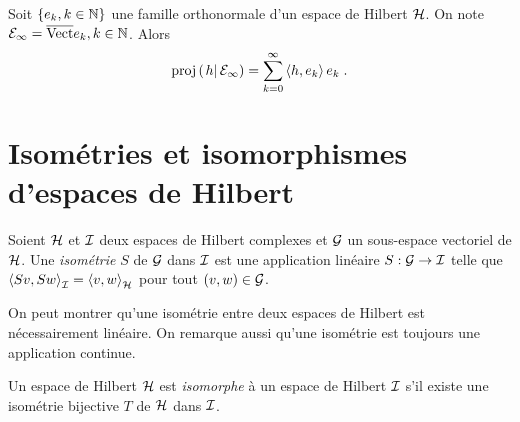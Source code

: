 \begin{corollary}
  Soit $\{ e_k, k \in \mathbb{N} \}$ une famille orthonormale d'un espace de
Hilbert $\mathcal{H}$. On note $\mathcal{E}_\infty=\overline{\mathrm{Vect}}{e_k, k \in \mathbb{N}}$. Alors
\[
\proj{h}{\cE_\infty} = \sum_{k=0}^\infty \pscal{h}{e_k} e_k \eqsp.
\]
\end{corollary}

%


\section{Isom\'{e}tries et isomorphismes d'espaces de Hilbert}
\begin{definition}
\label{def:isometrie}
Soient $\mathcal{H}$ et $\mathcal{I}$ deux espaces de Hilbert complexes et $\mathcal{G}$ un
sous-espace vectoriel de $\mathcal{H}$.  Une \emph{isom\'{e}trie} $S$ de $\mathcal{G}$ dans
$\mathcal{I}$ est une application lin\'{e}aire $S: \mathcal{G} \to \mathcal{I}$ telle que
$\left\langle Sv, Sw \right\rangle_{\mathcal{I}}= \left\langle v, w \right\rangle_{\mathcal{H}}$ pour tout $(v,w) \in \mathcal{G}$.
\end{definition}
On peut montrer qu'une isom\'{e}trie entre deux espaces de Hilbert est
n\'{e}cessairement lin\'{e}aire.
On remarque aussi qu'une isom\'{e}trie est toujours une application continue.

\begin{definition}
Un espace de Hilbert $\mathcal{H}$ est \emph{isomorphe} \`{a} un espace de Hilbert
$\mathcal{I}$ s'il existe une isom\'{e}trie bijective $T$ de $\mathcal{H}$ dans $\mathcal{I}$.
\end{definition}

